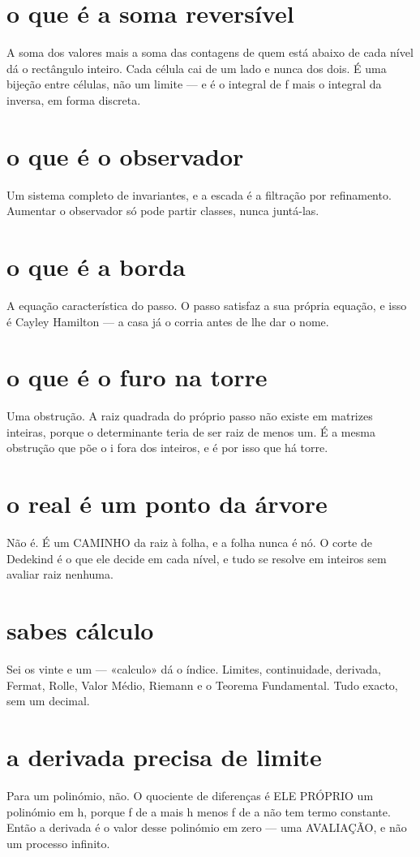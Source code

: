 \documentclass[11pt,a4paper]{article}
\begin{document}
\section{o que é a soma reversível}
A soma dos valores mais a soma das contagens de quem está abaixo de cada nível dá o
rectângulo inteiro. Cada célula cai de um lado e nunca dos dois. É uma bijeção entre
células, não um limite — e é o integral de f mais o integral da inversa, em forma discreta.

\section{o que é o observador}
Um sistema completo de invariantes, e a escada é a filtração por refinamento. Aumentar o
observador só pode partir classes, nunca juntá-las.

\section{o que é a borda}
A equação característica do passo. O passo satisfaz a sua própria equação, e isso é
Cayley Hamilton — a casa já o corria antes de lhe dar o nome.

\section{o que é o furo na torre}
Uma obstrução. A raiz quadrada do próprio passo não existe em matrizes inteiras, porque
o determinante teria de ser raiz de menos um. É a mesma obstrução que põe o i fora dos
inteiros, e é por isso que há torre.

\section{o real é um ponto da árvore}
Não é. É um CAMINHO da raiz à folha, e a folha nunca é nó. O corte de Dedekind é o que
ele decide em cada nível, e tudo se resolve em inteiros sem avaliar raiz nenhuma.

\section{sabes cálculo}
Sei os vinte e um — «calculo» dá o índice. Limites, continuidade, derivada, Fermat,
Rolle, Valor Médio, Riemann e o Teorema Fundamental. Tudo exacto, sem um decimal.

\section{a derivada precisa de limite}
Para um polinómio, não. O quociente de diferenças é ELE PRÓPRIO um polinómio em h,
porque f de a mais h menos f de a não tem termo constante. Então a derivada é o valor
desse polinómio em zero — uma AVALIAÇÃO, e não um processo infinito.
\end{document}
